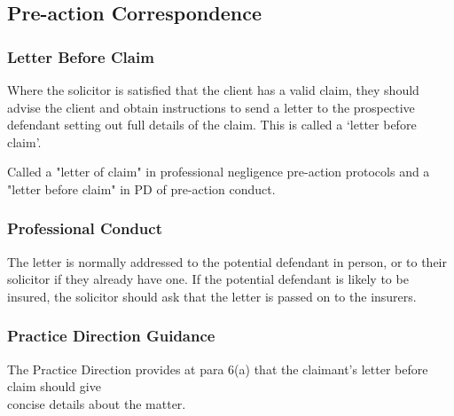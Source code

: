 \documentclass[
]{article}
\newenvironment{Shaded}{}{}
\newcommand{\NormalTok}[1]{#1}
\begin{document}
\hypertarget{pre-action-correspondence}{%
\subsection{Pre-action Correspondence}\label{pre-action-correspondence}}

\hypertarget{letter-before-claim}{%
\subsubsection{Letter Before Claim}\label{letter-before-claim}}

Where the solicitor is satisfied that the client has a valid claim, they
should advise the client and obtain instructions to send a letter to the
prospective defendant setting out full details of the claim. This is
called a `letter before claim'.

\begin{Shaded}
\begin{Highlighting}[]
\NormalTok{Called a "letter of claim" in professional negligence pre{-}action protocols and a "letter before claim" in PD of pre{-}action conduct. }
\end{Highlighting}
\end{Shaded}

\hypertarget{professional-conduct-4}{%
\subsubsection{Professional Conduct}\label{professional-conduct-4}}

The letter is normally addressed to the potential defendant in person,
or to their solicitor if they already have one. If the potential
defendant is likely to be insured, the solicitor should ask that the
letter is passed on to the insurers.

\hypertarget{practice-direction-guidance}{%
\subsubsection{Practice Direction
Guidance}\label{practice-direction-guidance}}

The Practice Direction provides at para 6(a) that the claimant's letter
before claim should give\\
concise details about the matter.
\end{document}
